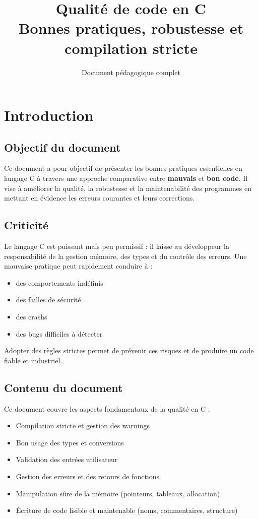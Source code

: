 \documentclass[a4paper,11pt]{report}
\title{\textbf{Qualité de code en C}\\
Bonnes pratiques, robustesse et compilation stricte}
\author{Document pédagogique complet}
\begin{document}
\maketitle
\tableofcontents
\newpage

\chapter{Introduction}

\section{Objectif du document}

Ce document a pour objectif de présenter les bonnes pratiques essentielles
en langage C à travers une approche comparative entre \textbf{mauvais} et
\textbf{bon code}. Il vise à améliorer la qualité, la robustesse et la
maintenabilité des programmes en mettant en évidence les erreurs courantes
et leurs corrections.

\section{Criticité}

Le langage C est puissant mais peu permissif : il laisse au développeur la
responsabilité de la gestion mémoire, des types et du contrôle des erreurs.
Une mauvaise pratique peut rapidement conduire à :
\begin{itemize}
  \item des comportements indéfinis
  \item des failles de sécurité
  \item des crashs
  \item des bugs difficiles à détecter
\end{itemize}

Adopter des règles strictes permet de prévenir ces risques et de produire
un code fiable et industriel.

\section{Contenu du document}

Ce document couvre les aspects fondamentaux de la qualité en C :
\begin{itemize}
  \item Compilation stricte et gestion des warnings
  \item Bon usage des types et conversions
  \item Validation des entrées utilisateur
  \item Gestion des erreurs et des retours de fonctions
  \item Manipulation sûre de la mémoire (pointeurs, tableaux, allocation)
  \item Écriture de code lisible et maintenable (noms, commentaires, structure)
\end{itemize}
\end{document}
